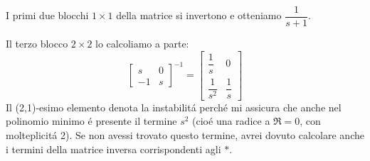 \documentclass[../main.tex]{subfiles}
\begin{document}
\begin{mdframed}[style=Esempio]
			I primi due blocchi $ 1 \times 1 $ della matrice si invertono e otteniamo $ \dfrac{1}{s+1} $.
			
			Il terzo blocco $ 2 \times 2 $ lo calcoliamo a parte:
			\[
				\begin{bmatrix}
					s	& 0
					\\[5pt]
					-1	& s
				\end{bmatrix}^{-1} =
				\begin{bmatrix}
					\dfrac{1}{s}	& 0
					\\[1em]
					\dfrac{1}{s^2}	& \dfrac{1}{s}
				\end{bmatrix}
			\]
			Il (2,1)-esimo elemento denota la instabilit\'a perch\'e mi assicura che anche nel polinomio minimo \'e presente il termine $ s^2 $ (cio\'e una radice a $ \Re = 0 $, con molteplicit\'a 2). Se non avessi trovato questo termine, avrei dovuto calcolare anche i termini della matrice inversa corrispondenti agli $ * $.
		\end{mdframed}
		
\end{document}
